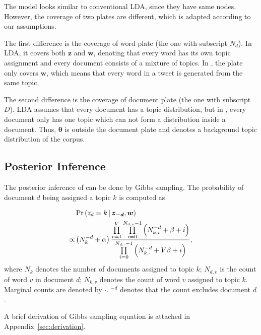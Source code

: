 The model looks similar to conventional LDA, since they have same nodes. However, the coverage of two plates are different, which is adapted according to our assumptions.

The first difference is the coverage of word plate (the one with subscript $N_d$). In LDA, it covers both $\bm{z}$ and $\bm{w}$, denoting that every word has its own topic assignment and every document consists of a mixture of topics. In \stlda, the plate only covers $\bm{w}$, which means that every word in a tweet is generated from the same topic.

The second difference is the coverage of document plate (the one with subscript $D$). LDA assumes that every document has a topic distribution, but in \stlda, every document only has one topic which can not form a distribution inside a document. Thus, $\bm{\theta}$ is outside the document plate and denotes a background topic distribution of the corpus.

\subsection{Posterior Inference}

The posterior inference of \stlda can be done by Gibbs sampling. The probability of document $d$ being assigned a topic $k$ is computed as

\begin{align}
&\Pr \left( z_d=k \,|\, \bm{z_{-d}},\bm{w} \right) \notag\\
\propto &\left( N_k^{-d} + \alpha \right) \frac {\prod\limits_{v=1}^{V} \prod\limits_{i=0}^{N_{d,v}-1} \left( N_{k,v}^{-d} + \beta + i \right)} {\prod\limits_{i=0}^{N_{d,\cdot}-1} \left( N_{k,\cdot}^{-d} + V\beta + i \right)},
\end{align}
where $N_k$ denotes the number of documents assigned to topic $k$; $N_{d,v}$ is the count of word $v$ in document $d$; $N_{k,v}$ denotes the count of word $v$ assigned to topic $k$. Marginal counts are denoted by $\cdot$. $^{-d}$ denotes that the count excludes document $d$.

A brief derivation of Gibbs sampling equation is attached in Appendix~\ref{sec:derivation}.



